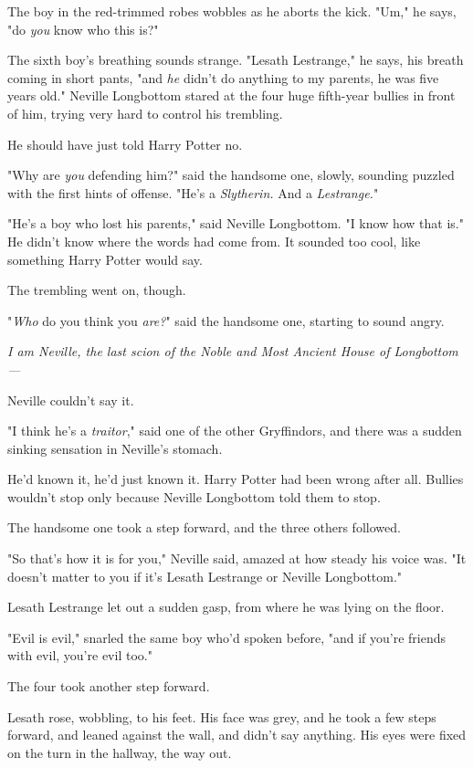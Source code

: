 The boy in the red-trimmed robes wobbles as he aborts the kick. "Um," he says,
"do \emph{you} know who this is?"

The sixth boy's breathing sounds strange. "Lesath Lestrange," he says, his
breath coming in short pants, "and \emph{he} didn't do anything to my parents,
he was five years old."
\later
Neville Longbottom stared at the four huge fifth-year bullies in front of him,
trying very hard to control his trembling.

He should have just told Harry Potter no.

"Why are \emph{you} defending him?" said the handsome one, slowly, sounding
puzzled with the first hints of offense. "He's a \emph{Slytherin.} And a
\emph{Lestrange.}"

"He's a boy who lost his parents," said Neville Longbottom. "I know how that
is." He didn't know where the words had come from. It sounded too cool, like
something Harry Potter would say.

The trembling went on, though.

"\emph{Who} do you think you \emph{are?}" said the handsome one, starting to
sound angry.

\emph{I am Neville, the last scion of the Noble and Most Ancient House of
Longbottom---}

Neville couldn't say it.

"I think he's a \emph{traitor}," said one of the other Gryffindors, and there
was a sudden sinking sensation in Neville's stomach.

He'd known it, he'd just known it. Harry Potter had been wrong after all.
Bullies wouldn't stop only because Neville Longbottom told them to stop.

The handsome one took a step forward, and the three others followed.

"So that's how it is for you," Neville said, amazed at how steady his voice
was. "It doesn't matter to you if it's Lesath Lestrange or Neville Longbottom."

Lesath Lestrange let out a sudden gasp, from where he was lying on the floor.

"Evil is evil," snarled the same boy who'd spoken before, "and if you're
friends with evil, you're evil too."

The four took another step forward.

Lesath rose, wobbling, to his feet. His face was grey, and he took a few steps
forward, and leaned against the wall, and didn't say anything. His eyes were
fixed on the turn in the hallway, the way out.

